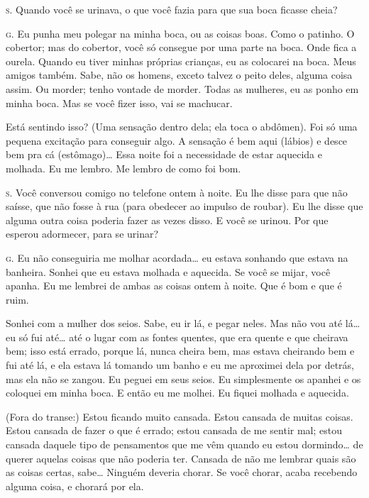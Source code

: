 \noindent\hskip0mm\textsc{s.} Quando você se urinava, o que você fazia para que sua boca ficasse
cheia?

\noindent\hskip0mm\textsc{g.} Eu punha meu polegar na minha boca, ou as coisas boas. Como o
patinho. O cobertor; mas do cobertor, você só consegue por uma parte na
boca. Onde fica a ourela. Quando eu tiver minhas próprias crianças, eu
as colocarei na boca. Meus amigos também. Sabe, não os homens, exceto
talvez o peito deles, alguma coisa assim. Ou morder; tenho vontade de
morder. Todas as mulheres, eu as ponho em minha boca. Mas se você fizer
isso, vai se machucar.

Está sentindo isso? (Uma sensação dentro dela; ela toca o abdômen).
Foi só uma pequena excitação para conseguir algo. A sensação é bem aqui
(lábios) e desce bem pra cá (estômago)\ldots{} Essa noite foi a necessidade
de estar aquecida e molhada. Eu me lembro. Me lembro de como foi bom.

\noindent\hskip0mm\textsc{s.} Você conversou comigo no telefone ontem à noite. Eu lhe disse para
que não saísse, que não fosse à rua (para obedecer ao impulso de
roubar). Eu lhe disse que alguma outra coisa poderia fazer as vezes
disso. E você se urinou. Por que esperou adormecer, para se urinar?

\noindent\hskip0mm\textsc{g.} Eu não conseguiria me molhar acordada\ldots{} eu estava sonhando que
estava na banheira. Sonhei que eu estava molhada e aquecida. Se você se
mijar, você apanha. Eu me lembrei de ambas as coisas ontem à noite. Que
é bom e que é ruim.

Sonhei com a mulher dos seios. Sabe, eu ir lá, e pegar neles. Mas
não vou até lá\ldots{} eu só fui até\ldots{} até o lugar com as fontes quentes,
que era quente e que cheirava bem; isso está errado, porque lá, nunca
cheira bem, mas estava cheirando bem e fui até lá, e ela estava lá
tomando um banho e eu me aproximei dela por detrás, mas ela não se
zangou. Eu peguei em seus seios. Eu simplesmente os apanhei e os
coloquei em minha boca. E então eu me molhei. Eu fiquei molhada e
aquecida.

(Fora do transe:) Estou ficando muito cansada. Estou cansada de
muitas coisas. Estou cansada de fazer o que é errado; estou cansada de
me sentir mal; estou cansada daquele tipo de pensamentos que me vêm
quando eu estou dormindo\ldots{} de querer aquelas coisas que não poderia
ter. Cansada de não me lembrar quais são as coisas certas, sabe\ldots{}
Ninguém deveria chorar. Se você chorar, acaba recebendo alguma coisa, e
chorará por ela.

